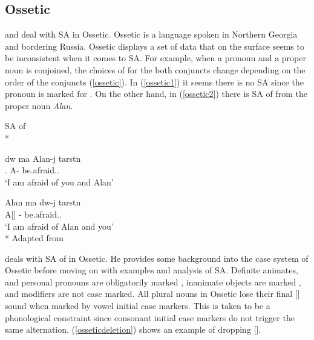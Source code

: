 \subsection{Ossetic}

\cite{erschler2012suspended} and \cite{erschler2018suspended} deal with SA in Ossetic. Ossetic is a language spoken in Northern Georgia and bordering Russia. Ossetic displays a set of data that on the surface seems to be inconsistent when it comes to SA. For example, when a pronoun and a proper noun is conjoined, the choices of {\Case} for the both conjuncts change depending on the order of the conjuncts (\ref{ossetic}). In (\ref{ossetic1}) it seems there is no SA since the pronoun {\Ssg} is marked for {\Obl}. On the other hand, in (\ref{ossetic2}) there is SA of {\Abl} from the proper noun \textit{Alan}.

\begin{exe}
    \ex \label{ossetic} SA of {\Abl}\\*
    \begin{xlist}
        \ex \label{ossetic1} 
        \gll d\textturna w \textturna ma Alan-\textturna j tarst\textturna n \\
        {\Ssg}.{\Obl} {\And} A-{\Abl} be.afraid.{\Pst}.{\Fsg} \\
        \glt `I am afraid of you and Alan'
        
        \ex \label{ossetic2} 
        \gll Alan \textturna ma d\textturna w-\textturna j tarst\textturna n \\
        A[{\Nom}] {\And} {\Ssg}-{\Abl} be.afraid.{\Pst}.{\Fsg} \\
        \glt `I am afraid of Alan and you'\\*
        \hfill Adapted from \cite{erschler2012suspended}
    \end{xlist}
\end{exe}

\cite{erschler2012suspended} deals with SA of {\Case} in Ossetic. He provides some background into the case system of Ossetic before moving on with examples and analysis of SA. Definite animates, and personal pronouns are obligatorily marked {\Obl}, inanimate objects are marked {\Nom}, and modifiers are not case marked. All plural nouns in Ossetic lose their final [\textturna] sound when marked by vowel initial case markers. This is taken to be a phonological constraint since consonant initial case markers do not trigger the same alternation. (\ref{osseticdeletion}) shows an example of dropping [\textturna].

